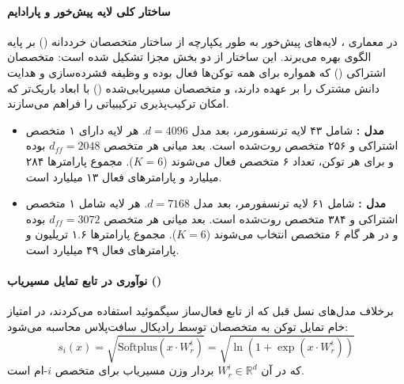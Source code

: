 \item {}

\paragraph*{ساختار کلی لایه پیش‌خور و پارادایم }
در معماری  \cite{deepseek2026v4}، لایه‌های پیش‌خور به طور یکپارچه از ساختار متخصصان خرددانه () بر پایه الگوی  \cite{dai2024deepseekmoe} بهره می‌برند. این ساختار از دو بخش مجزا تشکیل شده است: متخصصان اشتراکی () که همواره برای همه توکن‌ها فعال بوده و وظیفه فشرده‌سازی و هدایت دانش مشترک را بر عهده دارند، و متخصصان مسیریابی‌شده () با ابعاد باریک‌تر که امکان ترکیب‌پذیری ترکیبیاتی را فراهم می‌سازند.
\begin{itemize}
    \item \textbf{مدل :} شامل ۴۳ لایه ترنسفورمر، بعد مدل $d = 4096$. هر لایه  دارای ۱ متخصص اشتراکی و ۲۵۶ متخصص روت‌شده است. بعد میانی هر متخصص $d_{ff} = 2048$ بوده و برای هر توکن، تعداد ۶ متخصص فعال می‌شوند ($K=6$). مجموع پارامترها ۲۸۴ میلیارد و پارامترهای فعال ۱۳ میلیارد است.
    \item \textbf{مدل :} شامل ۶۱ لایه ترنسفورمر، بعد مدل $d = 7168$. هر لایه  شامل ۱ متخصص اشتراکی و ۳۸۴ متخصص روت‌شده است. بعد میانی هر متخصص $d_{ff} = 3072$ بوده و در هر گام ۶ متخصص انتخاب می‌شوند ($K=6$). مجموع پارامترها ۱.۶ تریلیون و پارامترهای فعال ۴۹ میلیارد است.
\end{itemize}

\paragraph*{نوآوری در تابع تمایل مسیریاب ()}
برخلاف مدل‌های نسل قبل که از تابع فعال‌ساز سیگموئید استفاده می‌کردند، در  امتیاز خام تمایل توکن به متخصصان توسط رادیکال سافت‌پلاس محاسبه می‌شود:
\begin{equation}
    s_i(x) = \sqrt{\text{Softplus}(x \cdot W_r^i)} = \sqrt{\ln\left(1 + \exp(x \cdot W_r^i)\right)}
\end{equation}
که در آن $W_r^i \in \mathbb{R}^{d}$ بردار وزن مسیریاب برای متخصص $i$-ام است.

